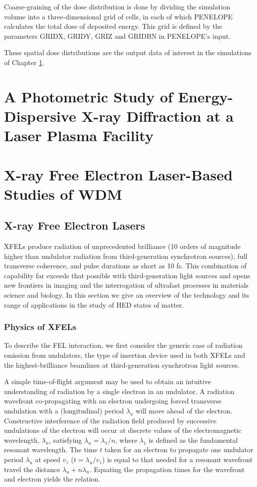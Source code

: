 \documentclass [11pt, proquest, article] {uwthesis}[2016/11/22]
\begin{document}
Coarse-graining of the dose distribution is done by dividing the simulation volume into a three-dimensional grid of cells, in each of which PENELOPE calculates the total dose of deposited energy. This grid is defined by the parameters GRIDX, GRIDY, GRIZ and GRIDBN in PENELOPE's input.

These spatial dose distributions are the output data of interest in the simulations of Chapter \ref{hef}.



\chapter{A Photometric Study of Energy-Dispersive X-ray Diffraction at a Laser Plasma Facility}
\label{hef}


\chapter{X-ray Free Electron Laser-Based Studies of WDM}
\label{xfel_experiment}
\section{X-ray Free Electron Lasers}
XFELs produce radiation of unprecedented brilliance (10 orders of magnitude higher than undulator radiation from third-generation synchrotron sources), full transverse coherence, and pulse durations as short as 10 fs. This combination of capability far exceeds that possible with third-generation light sources and opens new frontiers in imaging and the interrogation of ultrafast processes in materials science and biology.
In this section we give an overview of the technology and its range of applications in the study of HED states of matter.

\subsection{Physics of XFELs}
To describe the FEL interaction, we first consider the generic case of radiation emission from undulators, the type of insertion device used in both XFELs and the highest-brilliance beamlines at third-generation synchrotron light sources.

A simple time-of-flight argument may be used to obtain an intuitive understanding of radiation by a single electron in an undulator. A radiation wavefront co-propagating with an electron undergoing forced transverse undulation with a (longitudinal) period $\lambda_u$ will move ahead of the electron. Constructive interference of the radiation field produced by successive undulations of the electron will occur at discrete values of the electromagnetic wavelength, $\lambda_n$, satisfying $\lambda_n = \lambda_1 / n$, where $\lambda_1$ is defined as the fundamental resonant wavelength. The time $t$ taken for an electron to propagate one undulator period $\lambda_u$ at speed $v_z$ ($t = \lambda_u/v_z$) is equal to that needed for a resonant wavefront travel the distance $\lambda_u + n \lambda_n$. Equating the propagation times for the wavefront and electron yields the relation.\cite{mcneil2010x} 
\end{document}
